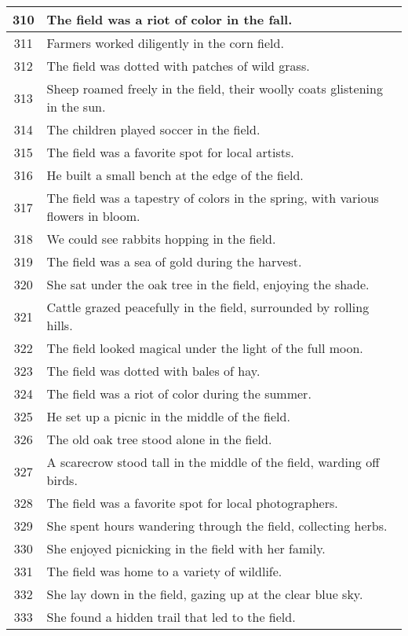 \begin{longtable}{|c|p{12cm}|}
310 & The field was a riot of color in the fall. \\ \hline
311 & Farmers worked diligently in the corn field. \\ \hline
312 & The field was dotted with patches of wild grass. \\ \hline
313 & Sheep roamed freely in the field, their woolly coats glistening in the sun. \\ \hline
314 & The children played soccer in the field. \\ \hline
315 & The field was a favorite spot for local artists. \\ \hline
316 & He built a small bench at the edge of the field. \\ \hline
317 & The field was a tapestry of colors in the spring, with various flowers in bloom. \\ \hline
318 & We could see rabbits hopping in the field. \\ \hline
319 & The field was a sea of gold during the harvest. \\ \hline
320 & She sat under the oak tree in the field, enjoying the shade. \\ \hline
321 & Cattle grazed peacefully in the field, surrounded by rolling hills. \\ \hline
322 & The field looked magical under the light of the full moon. \\ \hline
323 & The field was dotted with bales of hay. \\ \hline
324 & The field was a riot of color during the summer. \\ \hline
325 & He set up a picnic in the middle of the field. \\ \hline
326 & The old oak tree stood alone in the field. \\ \hline
327 & A scarecrow stood tall in the middle of the field, warding off birds. \\ \hline
328 & The field was a favorite spot for local photographers. \\ \hline
329 & She spent hours wandering through the field, collecting herbs. \\ \hline
330 & She enjoyed picnicking in the field with her family. \\ \hline
331 & The field was home to a variety of wildlife. \\ \hline
332 & She lay down in the field, gazing up at the clear blue sky. \\ \hline
333 & She found a hidden trail that led to the field. \\ \hline

\end{longtable}
